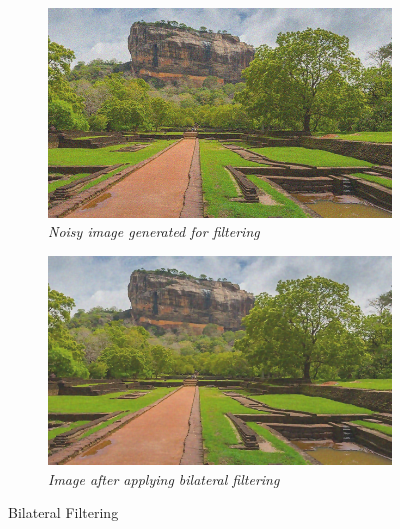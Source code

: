 \documentclass[11pt, a4paper]{article}
\begin{document}
\begin{center}
\begin{minipage}{0.8\textwidth}
\begin{figure}[H]
	\centering
	\begin{subfigure}[b]{0.45\textwidth}
		\centering
		\includegraphics[width=\textwidth]{./Outputs/Noisy_Image.png}
		\caption{{\small \textit{Noisy image generated for filtering}}}
	\end{subfigure}
	\hfill
	\begin{subfigure}[b]{0.45\textwidth}
		\centering
		\includegraphics[width=\textwidth]{./Outputs/Bilateral_Image.png}
		\caption{{\small \textit{Image after applying bilateral filtering}}}
		\label{fig:Bilateral Image}
	\end{subfigure}
	\caption{Bilateral Filtering}
\end{figure}
\end{minipage}
\end{center}
\end{document}
